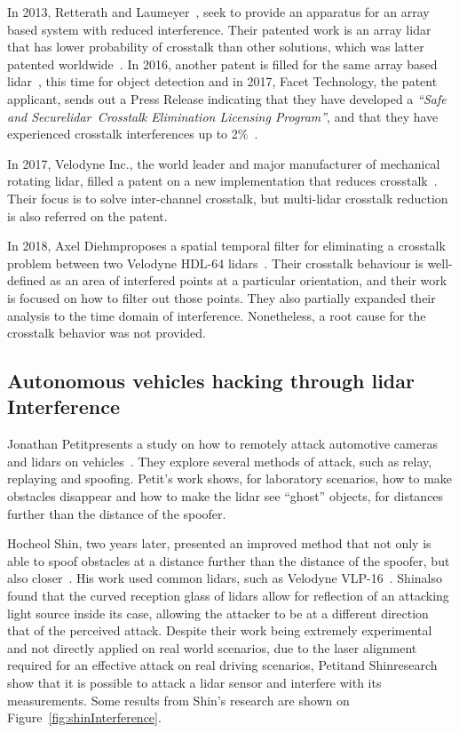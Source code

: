 In 2013, Retterath and Laumeyer~\cite{Retterath2015}, seek to provide an apparatus for an array based system with reduced interference. Their patented work is an array \ac{lidar} that has lower probability of crosstalk than other solutions, which was latter patented worldwide~\cite{Retterath2015WO}. In 2016, another patent is filled for the same array based \ac{lidar}~\cite{Retterath2016}, this time for object detection and in 2017, Facet Technology, the patent applicant, sends out a Press Release indicating that they have developed a \textit{``Safe and Secure\acs{lidar}\cp~Crosstalk Elimination Licensing Program''}, and that they have experienced crosstalk interferences up to 2\%~\cite{Facet}.

In 2017, Velodyne Inc., the world leader and  major manufacturer of mechanical rotating \ac{lidar}, filled a patent on a new implementation that reduces crosstalk~\cite{Hall2017}. Their focus is to solve inter-channel crosstalk, but multi-\ac{lidar} crosstalk reduction is also referred on the patent.

In 2018, Axel Diehm\etal proposes a spatial temporal filter for eliminating a crosstalk problem between two Velodyne HDL-64 \acp{lidar}~\cite{Hebel2018}. Their crosstalk behaviour is well-defined as an area of interfered points at a particular orientation, and their work is focused on how to filter out those points. They also partially expanded their analysis to the time domain of interference. Nonetheless, a root cause for the crosstalk behavior was not provided.

\subsection{Autonomous vehicles hacking through \ac{lidar} Interference}
Jonathan Petit\etal presents a study on how to remotely attack automotive cameras and \acp{lidar} on vehicles~\cite{Petit2015}. They explore several methods of attack, such as relay, replaying and spoofing. Petit's work shows, for laboratory scenarios, how to make obstacles disappear and how to make the \ac{lidar} see ``ghost'' objects, for distances further than the distance of the spoofer. 

Hocheol Shin\etal, two years later, presented an improved method that not only is able to spoof obstacles at a distance further than the distance of the spoofer, but also closer~\cite{Shin2017}. His work used common \acp{lidar}, such as Velodyne VLP-16~\cite{vlp16}. Shin\etal also found that the curved reception glass of \acp{lidar} allow for reflection of an attacking light source inside its case, allowing the attacker to be at a different direction that of the perceived attack. Despite their work being extremely experimental and not directly applied on real world scenarios, due to the laser alignment required for an effective attack on real driving scenarios, Petit\etal and Shin\etal research show that it is possible to attack a \ac{lidar} sensor and interfere with its measurements. Some results from Shin's research are shown on Figure~\ref{fig:shinInterference}.

